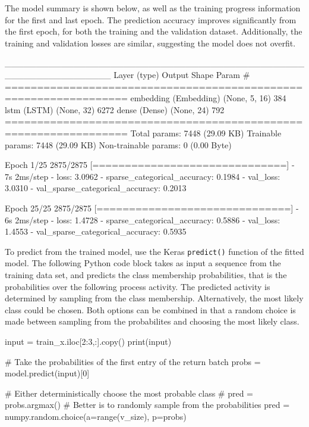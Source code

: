 \begin{withcode}
The model summary is shown below, as well as the training progress information for the first and last epoch. The prediction accuracy improves significantly from the first epoch, for both the training and the validation dataset. Additionally, the training and validation losses are similar, suggesting the model does not overfit.

\begin{textcode}
_________________________________________________________________
 Layer (type)                Output Shape              Param #   
=================================================================
 embedding (Embedding)       (None, 5, 16)             384       
 lstm (LSTM)                 (None, 32)                6272      
 dense (Dense)               (None, 24)                792       
=================================================================
Total params: 7448 (29.09 KB)
Trainable params: 7448 (29.09 KB)
Non-trainable params: 0 (0.00 Byte)

Epoch 1/25
2875/2875 [==============================] - 7s 2ms/step - 
loss: 3.0962 - sparse_categorical_accuracy: 0.1984 - 
val_loss: 3.0310 - val_sparse_categorical_accuracy: 0.2013

Epoch 25/25
2875/2875 [==============================] - 6s 2ms/step - 
loss: 1.4728 - sparse_categorical_accuracy: 0.5886 - 
val_loss: 1.4553 - val_sparse_categorical_accuracy: 0.5935
\end{textcode}

To predict from the trained model, use the Keras \texttt{predict()} function of the fitted model. The following Python code block takes as input a sequence from the training data set, and predicts the class membership probabilities, that is the probabilities over the following process activity. The predicted activity is determined by sampling from the class membership. Alternatively, the most likely class could be chosen. Both options can be combined in that a random choice is made between sampling from the probabilites and choosing the most likely class. 

\begin{pythoncode}
input = train_x.iloc[2:3,:].copy()
print(input)

# Take the probabilities of the first entry of the return batch
probs = model.predict(input)[0]

# Either deterministically choose the most probable class
# pred = probs.argmax()
# Better is to randomly sample from the probabilities
pred = numpy.random.choice(a=range(v_size), p=probs)


\end{pythoncode}
\end{withcode}
